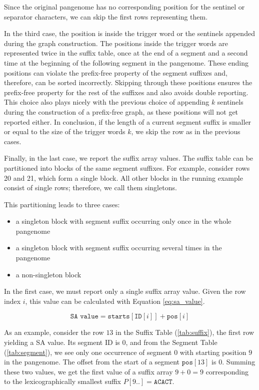 Since the original pangenome has no corresponding position for the sentinel or separator characters, we can skip the first rows representing them.

In the third case, the position is inside the trigger word or the sentinels appended during the graph construction.
The positions inside the trigger words are represented twice in the suffix table, once at the end of a segment and a second time at the beginning of the following segment in the pangenome.
These ending positions can violate the prefix-free property of the segment suffixes and, therefore, can be sorted incorrectly.
Skipping through these positions ensures the prefix-free property for the rest of the suffixes and also avoids double reporting.
This choice also plays nicely with the previous choice of appending $k$ sentinels during the construction of a prefix-free graph, as these positions will not get reported either.
In conclusion, if the length of a current segment suffix is smaller or equal to the size of the trigger words $k$, we skip the row as in the previous cases.

Finally, in the last case, we report the suffix array values.
The suffix table can be partitioned into blocks of the same segment suffixes.
For example, consider rows 20 and 21, which form a single block.
All other blocks in the running example consist of single rows; therefore, we call them singletons.

This partitioning leads to three cases:
\begin{itemize}
    \item a singleton block with segment suffix occurring only once in the whole pangenome
    \item a singleton block with segment suffix occurring several times in the pangenome
    \item a non-singleton block
\end{itemize}

In the first case, we must report only a single suffix array value.
Given the row index $i$, this value can be calculated with Equation \ref{eq:sa_value}.

\begin{equation}
    \label{eq:sa_value}
    \texttt{SA value} = \texttt{starts}[\texttt{ID}[i]] + \texttt{pos}[i]
\end{equation}

As an example, consider the row $13$ in the Suffix Table (\ref{tab:suffix}), the first row yielding a SA value.
Its segment ID is $0$, and from the Segment Table (\ref{tab:segment}), we see only one occurrence of segment $0$ with starting position $9$ in the pangenome.
The offset from the start of a segment $\texttt{pos}[13]$ is $0$.
Summing these two values, we get the first value of a suffix array $9 + 0 = 9$ corresponding to the lexicographically smallest suffix $P[9..] = \texttt{ACACT}$.

